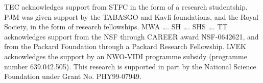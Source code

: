 TEC acknowledges support from STFC in the form of a research studentship.
%
PJM was given support by the TABASGO and Kavli foundations, and the Royal 
Society, in the form of research fellowships.
%
MWA \ldots. SH \ldots. SHS \ldots.
%
TT acknowledges support from the NSF through CAREER award NSF-0642621,
and from the Packard Foundation through a Packard Research Fellowship.
% 
LVEK acknowledges the support by an NWO-VIDI programme subsidy
(programme number 639.042.505).
%
This research is supported in part by the National Science Foundation under
Grant No. PHY99-07949.

